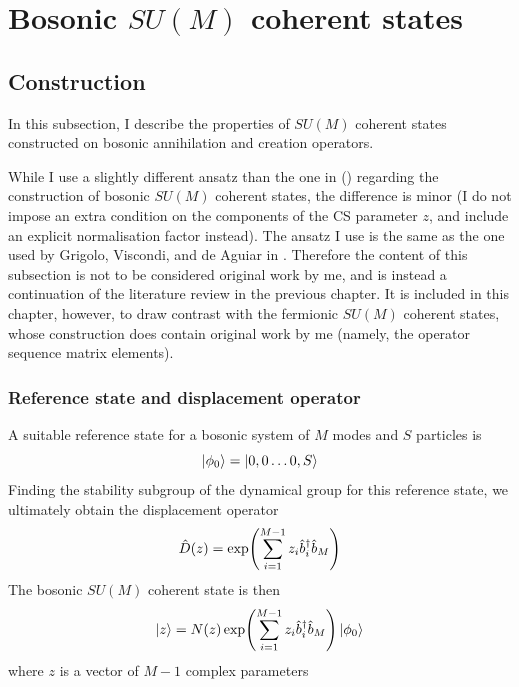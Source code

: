 \section{Bosonic $SU(M)$ coherent states}
	
\subsection{Construction}
In this subsection, I describe the properties of $SU(M)$ coherent states constructed on bosonic annihilation and creation operators.

While I use a slightly different ansatz than the one in (\cite{grossmann,buonsante}) regarding the construction of bosonic $SU(M)$ coherent states, the difference is minor (I do not impose an extra condition on the components of the CS parameter $z$, and include an explicit normalisation factor instead). The ansatz I use is the same as the one used by Grigolo, Viscondi, and de Aguiar in \cite{sampling_algorithm}. Therefore the content of this subsection is not to be considered original work by me, and is instead a continuation of the literature review in the previous chapter. It is included in this chapter, however, to draw contrast with the fermionic $SU(M)$ coherent states, whose construction does contain original work by me (namely, the operator sequence matrix elements).

\subsubsection{Reference state and displacement operator}
A suitable reference state for a bosonic system of $M$ modes and $S$ particles is
\begin{equation}
\ket{\phi_0}=\ket{0,0\dots 0, S}
\end{equation}
Finding the stability subgroup of the dynamical group for this reference state, we ultimately obtain the displacement operator
\begin{equation}
\hat{D}(z)=\exp(\sum_{i=1}^{M-1}z_i\hat{b}^\dagger_i\hat{b}_M)
\end{equation}
The bosonic $SU(M)$ coherent state is then
\begin{equation}
\ket{z}=N(z)\exp(\sum_{i=1}^{M-1}z_i\hat{b}^\dagger_i\hat{b}_M)\ket{\phi_0}
\end{equation}
where $z$ is a vector of $M-1$ complex parameters

